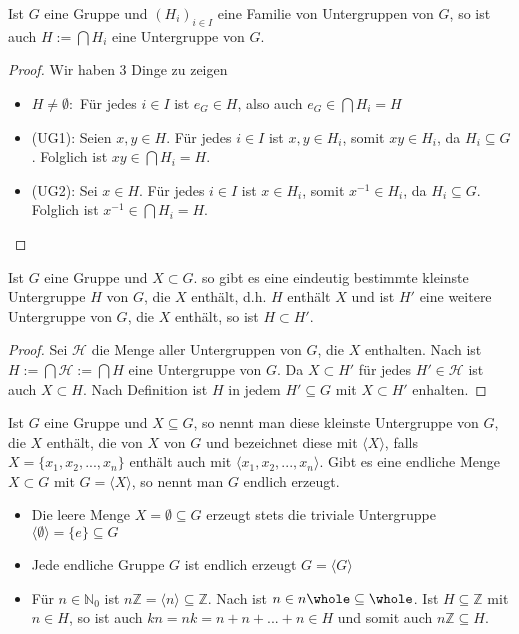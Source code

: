 \begin{lemma}
	Ist $G$ eine Gruppe und $(H_i)_{i \in I}$ eine Familie von Untergruppen von $G$,
	so ist auch $H := \bigcap H_i$ eine Untergruppe von $G$.
\end{lemma}
\begin{proof}
	Wir haben 3 Dinge zu zeigen
	\begin{itemize}
		\item $H \neq \emptyset:$ Für jedes $i \in I$ ist $e_G \in H$, also auch $e_G \in \bigcap
		H_i =H$
		\item (UG1): Seien $x,y \in H$. Für jedes $i \in I$ ist $x,y \in H_i$, somit $xy \in H_i$,
		da $H_i \subseteq G$. Folglich ist $xy \in \bigcap H_i=H$.
		\item (UG2): Sei $x \in H$. Für jedes $i \in I$ ist $x \in H_i$, somit $x^{-1} \in H_i$,
		da $H_i \subseteq G$. Folglich ist $x^{-1} \in \bigcap H_i=H$.
	\end{itemize}
\end{proof}

\begin{proposition}
	Ist $G$ eine Gruppe und $X \subset G$. so gibt es eine eindeutig bestimmte
	kleinste Untergruppe $H$ von $G$, die $X$ enthält, d.h. $H$ enthält $X$ und ist $H'$
	eine weitere Untergruppe von $G$, die $X$ enthält, so ist $H \subset H'$.
\end{proposition}
\begin{proof}
	Sei $\mathcal{H}$ die Menge aller Untergruppen von $G$, die $X$ enthalten. Nach 
	ist $H:=
	\bigcap \mathcal{H} := \bigcap H$ eine Untergruppe von $G$. Da $X \subset H'$ für jedes $H' \in 
	\mathcal H$ ist auch $X \subset H$. Nach Definition ist $H$ in jedem $H' \subseteq G$ mit $X \subset H'$
	enhalten.
\end{proof}

\begin{definition}
	Ist $G$ eine Gruppe und $X \subseteq G$, so nennt man diese
	kleinste Untergruppe von $G$, die $X$ enthält, die von $X$  von $G$ und
	bezeichnet diese mit $\langle X\rangle$, falls $X = \{x_1,x_2,...,x_n\}$ enthält auch mit $\langle x_1,x_2,
	...,x_n\rangle$. Gibt es eine endliche Menge $X \subset G$ mit $G=\langle X\rangle$, so nennt man $G$ endlich
	erzeugt.
\end{definition}

\begin{example}
	\begin{itemize}
		\item Die leere Menge $X=\emptyset \subseteq G$ erzeugt stets die triviale Untergruppe $\langle \emptyset\rangle
		=\{e\} \subseteq G$
		\item Jede endliche Gruppe $G$ ist endlich erzeugt $G=\langle G\rangle$
		\item Für $n \in \mathbb{N}_0$ ist $n\mathbb{Z}=\langle n\rangle \subseteq \mathbb{Z}$. Nach  ist $n\in n\whole\subseteq\whole$. Ist $H \subseteq \mathbb{Z}$
		mit $n \in H$, so ist auch $kn=nk=n+n+...+n \in H$ und somit auch $n\mathbb{Z} \subseteq H$.
	\end{itemize}
\end{example}
